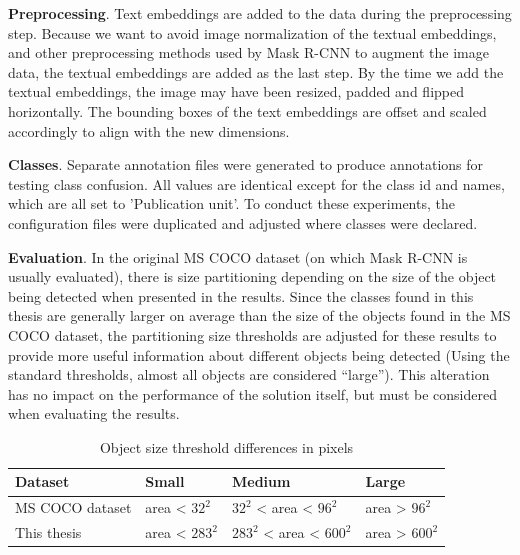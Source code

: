 \documentclass[oneside, english, bibtex]{kththesis}
\begin{document}
\textbf{Preprocessing}. Text embeddings are added to the data during the preprocessing step.
Because we want to avoid image normalization of the textual embeddings, and other preprocessing methods used by Mask R-CNN to augment the image data,
the textual embeddings are added as the last step. By the time we add the textual embeddings, the image may have been resized, padded and flipped horizontally.
The bounding boxes of the text embeddings are offset and scaled accordingly to align with the new dimensions.

\textbf{Classes}. Separate annotation files were generated to produce annotations for testing class confusion.
All values are identical except for the class id and names, which are all set to 'Publication unit'.
To conduct these experiments, the configuration files were duplicated and adjusted where classes were declared.

\textbf{Evaluation}. In the original MS COCO dataset (on which Mask R-CNN is usually evaluated),
there is size partitioning depending on the size of the object being detected when presented in the results.
Since the classes found in this thesis are generally larger on average than the size of the objects found in the MS COCO dataset,
the partitioning size thresholds are adjusted for these results to provide more useful information about different objects being detected (Using the standard thresholds, almost all objects are considered “large”).
This alteration has no impact on the performance of the solution itself, but must be considered when evaluating the results.

\begin{table}[H]
  \begin{center}
    \caption{Object size threshold differences in pixels}
    \label{tab:objectsizes}
    \begin{tabular}{l|l|l|l} %
    \textbf{Dataset} & \textbf{Small} & \textbf{Medium} & \textbf{Large}  \\
    \hline
    MS COCO dataset & area < $32^2$ & $32^2$ < area < $96^2$ & area > $96^2$  \\    \hline
    This thesis & area < $283^2$ & $283^2$ < area < $600^2$ & area > $600^2$ \\    \hline
    \end{tabular}
  \end{center}
\end{table}
\end{document}
